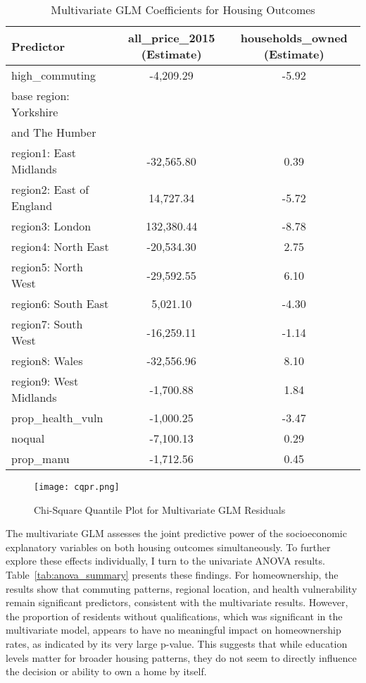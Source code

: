 \documentclass[12pt]{article}
\begin{document}
\begin{table}[htbp]
\centering
\caption{Multivariate GLM Coefficients for Housing Outcomes}
\label{tab:coeffs}
\begin{tabular}{lcc}
\hline
\textbf{Predictor} & \textbf{all\_price\_2015 (Estimate)} & \textbf{households\_owned (Estimate)} \\
\hline
high\_commuting & -4,209.29 & -5.92 \\
base region: Yorkshire & &\\
and The Humber & & \\
region1: East Midlands & -32,565.80 & 0.39 \\
region2: East of England & 14,727.34 & -5.72 \\
region3: London & 132,380.44 & -8.78 \\
region4: North East & -20,534.30 & 2.75 \\
region5: North West & -29,592.55 & 6.10 \\
region6: South East & 5,021.10 & -4.30 \\
region7: South West & -16,259.11 & -1.14 \\
region8: Wales & -32,556.96 & 8.10 \\
region9: West Midlands & -1,700.88 & 1.84 \\
prop\_health\_vuln & -1,000.25 & -3.47 \\
noqual & -7,100.13 & 0.29 \\
prop\_manu & -1,712.56 & 0.45 \\
\hline
\end{tabular}
\end{table}

\begin{figure}
    \centering
    \texttt{[image: cqpr.png]}
    \caption{Chi-Square Quantile Plot for Multivariate GLM Residuals}
    \label{fig:cqplotresid}
\end{figure}

The multivariate GLM assesses the joint predictive power of the socioeconomic explanatory variables on both housing outcomes simultaneously. To further explore these effects individually, I turn to the univariate ANOVA results. Table~\ref{tab:anova_summary} presents these findings. For homeownership, the results show that commuting patterns, regional location, and health vulnerability remain significant predictors, consistent with the multivariate results. However, the proportion of residents without qualifications, which was significant in the multivariate model, appears to have no meaningful impact on homeownership rates, as indicated by its very large p-value. This suggests that while education levels matter for broader housing patterns, they do not seem to directly influence the decision or ability to own a home by itself. 
\end{document}
